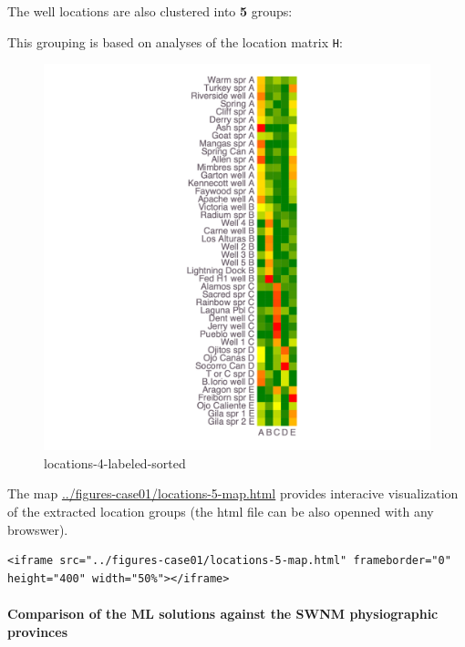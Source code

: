 \documentclass[11pt]{article}
\begin{document}
The well locations are also clustered into \textbf{5} groups:

This grouping is based on analyses of the location matrix \texttt{H}:

\begin{figure}
\centering
\includegraphics{../figures-case01/locations-5-labeled-sorted.png}
\caption{locations-4-labeled-sorted}
\end{figure}

The map \url{../figures-case01/locations-5-map.html} provides interacive
visualization of the extracted location groups (the html file can be
also openned with any browswer).

\begin{verbatim}
<iframe src="../figures-case01/locations-5-map.html" frameborder="0" height="400" width="50%"></iframe>
\end{verbatim}

    \hypertarget{comparison-of-the-ml-solutions-against-the-swnm-physiographic-provinces}{%
\paragraph{Comparison of the ML solutions against the SWNM physiographic
provinces}\label{comparison-of-the-ml-solutions-against-the-swnm-physiographic-provinces}}
\end{document}
